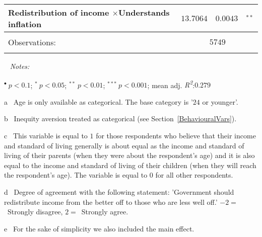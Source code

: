 \documentclass[a4paper,12pt]{article}
\begin{document}
{\begin{threeparttable}
\begin{small}
\begin{tabular}{lccl}
 \vspace{0.15cm}\textbf{Redistribution of income\tnote{d} \hspace{0.1cm}$\boldsymbol{\times}$\hspace{0.1cm}Understands inflation}&$13.7064$&$0.0043$&$^{**}$
\\
\hline
\vspace{-0.4cm} \\ Observations:&    \multicolumn{3}{c}{$5749$} \\  \vspace{-0.4cm}
\\
\hline
\end{tabular} 
\end{small}
 \begin{tablenotes}
  \begin{footnotesize}
     \item[~]\textit{Notes:} \vspace{-0.35cm} \begin{adjustwidth}{0.7cm}{}  \hspace{0.7cm}$^{\bullet}~p<0.1$; $^{*}~p<0.05$; $^{**}~p<0.01$; $^{***}~p<0.001$;\hspace{0.2cm} mean adj. \textit{R\textsuperscript2}:\hspace{0.25cm}$0.279$
\item[a]~Age is only available as categorical. The base category is '$24$ or younger'.
\item[b]~Inequity aversion treated as categorical (see Section~\ref{BehaviouralVars}). \item[c]~This variable is equal to $1$ for those respondents who believe that their income and standard of living generally is about equal as the income and standard of living of their parents (when they were about the respondent's age) and it is also equal to the income and standard of living of their children (when they will reach the respondent's age). The variable is equal to $0$ for all other respondents.
\vspace{0.002cm} 
 \item[d]~Degree of agreement with the following statement: 'Government should redistribute income from the better off to those who are less well off.' $-2=$~Strongly disagree, $2=$~Strongly agree.
  \item[e]~For the sake of simplicity we also included the main effect.
    \end{adjustwidth}
\singlespacing
  \end{footnotesize}
\end{tablenotes}
  \end{threeparttable} 
\par}
\end{document}
